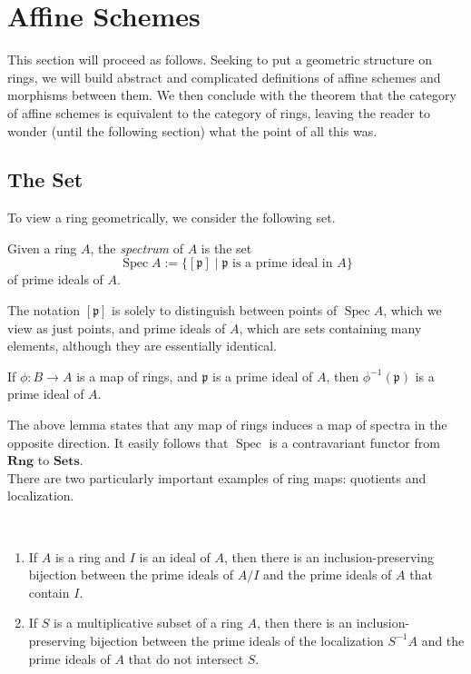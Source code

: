 \documentclass[11pt,openany]{book} %
\newcommand{\spc}{\operatorname{Spec}}
\begin{document}
\section{Affine Schemes}
This section will proceed as follows. Seeking to put a geometric structure on rings, we will build abstract and complicated definitions of affine schemes and morphisms between them. We then conclude with the theorem that the category of affine schemes is equivalent to the category of rings, leaving the reader to wonder (until the following section) what the point of all this was.


\subsection{The Set}
To view a ring geometrically, we consider the following set.\\

\begin{definition}
Given a ring $A$, the \emph{spectrum} of $A$ is the set
\[
	\spc A := \{[\mathfrak{p}] \mid \mathfrak{p} \text{ is a prime ideal in } A\}
\]
of prime ideals of $A$. 
\end{definition}

\begin{remark}
The notation $[\mathfrak{p}]$ is solely to distinguish between points of $\spc A$, which we view as just points, and prime ideals of $A$, which are sets containing many elements, although they are essentially identical.
\end{remark}

\begin{lemma} \label{spcset}
If $\phi : B \to A$ is a map of rings, and $\mathfrak{p}$ is a prime ideal of $A$, then $\phi^{-1}(\mathfrak{p})$ is a prime ideal of $A$.
\end{lemma}

\medskip
The above lemma states that any map of rings induces a map of spectra in the opposite direction. It easily follows that $\spc$ is a contravariant functor from $\mathbf{Rng}$ to $\mathbf{Sets}$.\\

There are two particularly important examples of ring maps: quotients and localization.
\pagebreak

\begin{theorem}\ \label{ringbij}
\begin{enumerate}[label=$\blacktriangleright$]
	\item If $A$ is a ring and $I$ is an ideal of $A$, then there is an inclusion-preserving bijection between the prime ideals of $A/I$ and the prime ideals of $A$ that contain $I$.

	\item If $S$ is a multiplicative subset of a ring $A$, then there is an inclusion-preserving bijection between the prime ideals of the localization $S^{-1}A$ and the prime ideals of $A$ that do not intersect $S$.
\end{enumerate}
\end{theorem}
\end{document}
